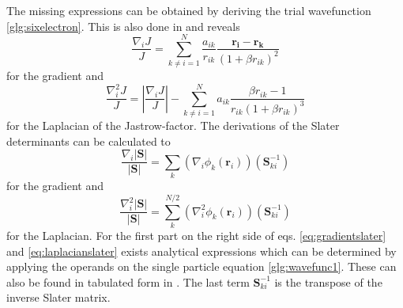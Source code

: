 The missing expressions can be obtained by deriving the trial wavefunction \ref{glg:sixelectron}. This is also done in \citet{hogberget2013} and reveals 
\begin{equation}\label{eq:jastrow-derivations}
    \frac{\nabla_i J}{J} = \sum_{k\neq i = 1}^{N}\frac{a_{ik}}{r_{ik}} \frac{\mathbf{r_i}-\mathbf{r_k}}{\left(1 + \beta r_{ik} \right)^2}
\end{equation}
for the gradient and 
\begin{equation}
    \frac{\nabla_i^2 J}{J} = \left| \frac{\nabla_i J}{J} \right| - \sum_{k\neq i = 1}^{N}a_{ik} \frac{\beta r_{ik} - 1}{r_{ik}\left(1 +\beta r_{ik} \right)^3} 
\end{equation}
for the Laplacian of the Jastrow-factor. The derivations of the Slater determinants can be calculated to
\begin{equation}\label{eq:gradientslater}
    \frac{\nabla_i |\mathbf{S}|}{|\mathbf{S}|} = \sum_k \left( \nabla_i \phi_k(\mathbf{r}_i)\right)(\mathbf{S}_{ki}^{-1})
\end{equation}
for the gradient and
\begin{equation}\label{eq:laplacianslater}
    \frac{\nabla_i^2 |\mathbf{S}|}{|\mathbf{S}|} = \sum_k^{N/2} \left( \nabla_i^2 \phi_k(\mathbf{r}_i)\right)(\mathbf{S}_{ki}^{-1})
\end{equation}
for the Laplacian. For the first part on the right side of eqs. \ref{eq:gradientslater} and \ref{eq:laplacianslater} exists analytical expressions which can be determined by applying the operands on the single particle equation \ref{glg:wavefunc1}. These can also be found in tabulated form in \citet[app. D]{hogberget2013}. The last term $\mathbf{S}_{ki}^{-1}$ is the transpose of the inverse Slater matrix. 